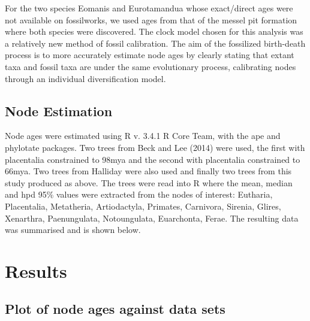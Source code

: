 \documentclass[11pt,letterpaper]{article}
\begin{document}
 For the two species Eomanis and Eurotamandua whose exact/direct ages were not available on fossilworks, we used ages from that of the messel pit formation where both species were discovered.
 The clock model chosen for this analysis was a relatively new method of fossil calibration. %
 The aim of the fossilized birth-death process is to more accurately estimate node ages by clearly stating that extant taxa and fossil taxa are under the same evolutionary process, calibrating nodes through an individual diversification model. %



\newpage

\subsection{Node Estimation}

Node ages were estimated using R v. 3.4.1 R Core Team, with the ape and phylotate packages. %
Two trees from Beck and Lee (2014) were used, the first with placentalia constrained to 98mya and the second with placentalia constrained to 66mya.
Two trees from Halliday were also used %
and finally two trees from this study produced as above.
The trees were read into R where the mean, median and hpd 95\% values were extracted from the nodes of interest: Eutharia, Placentalia, Metatheria, Artiodactyla, Primates, Carnivora, Sirenia, Glires, Xenarthra, Paenungulata, Notoungulata, Euarchonta, Ferae.
The resulting data was summarised and is shown below. %

\newpage

\section{Results} 

\subsection{Plot of node ages against data sets}
\end{document}
